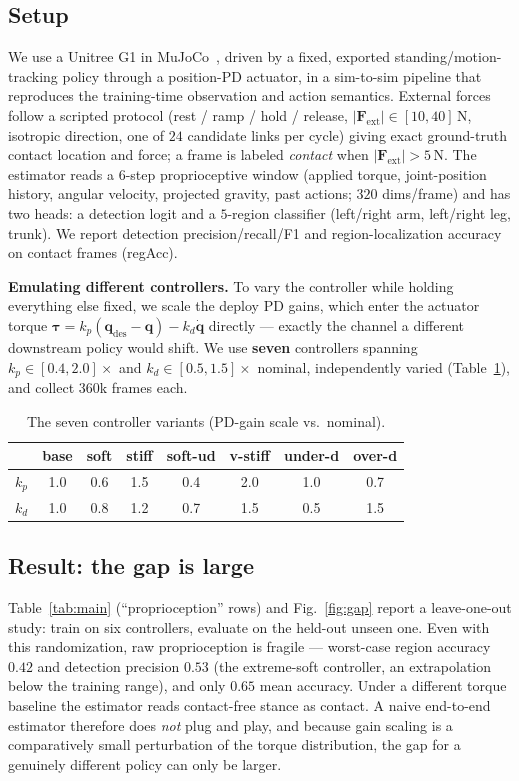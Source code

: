 \documentclass[conference]{IEEEtran}
\newcommand{\Fext}{\mathbf{F}_{\mathrm{ext}}}
\begin{document}
\subsection{Setup}
We use a Unitree G1 in MuJoCo~\cite{todorov2012mujoco}, driven by a fixed,
exported standing/motion-tracking policy through a position-PD actuator, in a
sim-to-sim pipeline that reproduces the training-time observation and action
semantics. External forces follow a scripted protocol (rest / ramp / hold /
release, $|\Fext|\!\in\![10,40]$\,N, isotropic direction, one of $24$ candidate
links per cycle) giving exact ground-truth contact location and force; a frame is
labeled \emph{contact} when $|\Fext|>5$\,N. The estimator reads a $6$-step
proprioceptive window (applied torque, joint-position history, angular velocity,
projected gravity, past actions; $320$ dims/frame) and has two heads: a detection
logit and a $5$-region classifier (left/right arm, left/right leg, trunk). We
report detection precision/recall/F1 and region-localization accuracy on contact
frames (regAcc).

\textbf{Emulating different controllers.} To vary the controller while holding
everything else fixed, we scale the deploy PD gains, which enter the actuator
torque $\boldsymbol{\tau}=k_p(\mathbf{q}_{\mathrm{des}}-\mathbf{q})-k_d\dot{\mathbf{q}}$
directly --- exactly the channel a different downstream policy would shift. We use
\textbf{seven} controllers spanning $k_p\!\in\![0.4,2.0]\times$ and
$k_d\!\in\![0.5,1.5]\times$ nominal, independently varied (Table~\ref{tab:ctrl}),
and collect $360$k frames each.

\begin{table}[t]
\centering
\caption{The seven controller variants (PD-gain scale vs.\ nominal).}
\label{tab:ctrl}
\small
\begin{tabular}{lccccccc}
\toprule
 & base & soft & stiff & soft-ud & v-stiff & under-d & over-d \\
\midrule
$k_p$ & 1.0 & 0.6 & 1.5 & 0.4 & 2.0 & 1.0 & 0.7 \\
$k_d$ & 1.0 & 0.8 & 1.2 & 0.7 & 1.5 & 0.5 & 1.5 \\
\bottomrule
\end{tabular}
\end{table}

\subsection{Result: the gap is large}
Table~\ref{tab:main} (``proprioception'' rows) and Fig.~\ref{fig:gap} report a
leave-one-out study: train on six controllers, evaluate on the held-out unseen
one. Even with this randomization, raw proprioception is fragile --- worst-case
region accuracy $0.42$ and detection precision $0.53$ (the extreme-soft
controller, an extrapolation below the training range), and only $0.65$ mean
accuracy. Under a different torque baseline the estimator reads contact-free
stance as contact. A naive end-to-end estimator therefore does \emph{not} plug and
play, and because gain scaling is a comparatively small perturbation of the torque
distribution, the gap for a genuinely different policy can only be larger.
\end{document}
